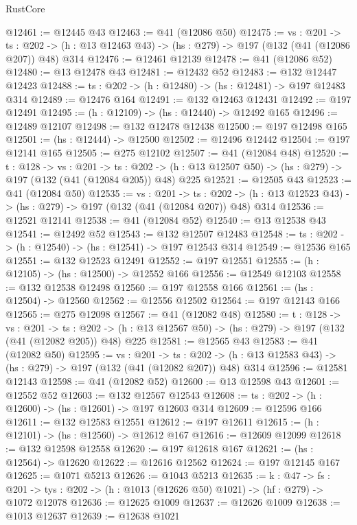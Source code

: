 \begin{lexlean}{RustCore}
\begin{coremodule}
@12461 := @12445 @43
@12463 := @41 (@12086 @50)
@12475 := {vs : @201} ->
  {ts : @202} -> (h : @13 @12463 @43) -> (hs : @279) -> @197 (@132 (@41 (@12086 @207)) @48) @314
@12476 := @12461 @12139
@12478 := @41 (@12086 @52)
@12480 := @13 @12478 @43
@12481 := @12432 @52
@12483 := @132 @12447 @12423
@12488 := {ts : @202} -> (h : @12480) -> (hs : @12481) -> @197 @12483 @314
@12489 := @12476 @164
@12491 := @132 @12463 @12431
@12492 := @197 @12491
@12495 := (h : @12109) -> (hs : @12440) -> @12492 @165
@12496 := @12489 @12107
@12498 := @132 @12478 @12438
@12500 := @197 @12498 @165
@12501 := (hs : @12444) -> @12500
@12502 := @12496 @12442
@12504 := @197 @12141 @165
@12505 := @275 @12102
@12507 := @41 (@12084 @48)
@12520 := {t : @128} ->
  {vs : @201} ->
  {ts : @202} -> (h : @13 @12507 @50) -> (hs : @279) -> @197 (@132 (@41 (@12084 @205)) @48) @225
@12521 := @12505 @43
@12523 := @41 (@12084 @50)
@12535 := {vs : @201} ->
  {ts : @202} -> (h : @13 @12523 @43) -> (hs : @279) -> @197 (@132 (@41 (@12084 @207)) @48) @314
@12536 := @12521 @12141
@12538 := @41 (@12084 @52)
@12540 := @13 @12538 @43
@12541 := @12492 @52
@12543 := @132 @12507 @12483
@12548 := {ts : @202} -> (h : @12540) -> (hs : @12541) -> @197 @12543 @314
@12549 := @12536 @165
@12551 := @132 @12523 @12491
@12552 := @197 @12551
@12555 := (h : @12105) -> (hs : @12500) -> @12552 @166
@12556 := @12549 @12103
@12558 := @132 @12538 @12498
@12560 := @197 @12558 @166
@12561 := (hs : @12504) -> @12560
@12562 := @12556 @12502
@12564 := @197 @12143 @166
@12565 := @275 @12098
@12567 := @41 (@12082 @48)
@12580 := {t : @128} ->
  {vs : @201} ->
  {ts : @202} -> (h : @13 @12567 @50) -> (hs : @279) -> @197 (@132 (@41 (@12082 @205)) @48) @225
@12581 := @12565 @43
@12583 := @41 (@12082 @50)
@12595 := {vs : @201} ->
  {ts : @202} -> (h : @13 @12583 @43) -> (hs : @279) -> @197 (@132 (@41 (@12082 @207)) @48) @314
@12596 := @12581 @12143
@12598 := @41 (@12082 @52)
@12600 := @13 @12598 @43
@12601 := @12552 @52
@12603 := @132 @12567 @12543
@12608 := {ts : @202} -> (h : @12600) -> (hs : @12601) -> @197 @12603 @314
@12609 := @12596 @166
@12611 := @132 @12583 @12551
@12612 := @197 @12611
@12615 := (h : @12101) -> (hs : @12560) -> @12612 @167
@12616 := @12609 @12099
@12618 := @132 @12598 @12558
@12620 := @197 @12618 @167
@12621 := (hs : @12564) -> @12620
@12622 := @12616 @12562
@12624 := @197 @12145 @167
@12625 := @1071 @5213
@12626 := @1043 @5213
@12635 := {k : @47} ->
  {fs : @201} -> {tys : @202} -> (h : @1013 (@12626 @50) @1021) -> (hf : @279) -> @1072 @12078
@12636 := @12625 @1009
@12637 := @12626 @1009
@12638 := @1013 @12637
@12639 := @12638 @1021

\end{coremodule}
\end{lexlean}
